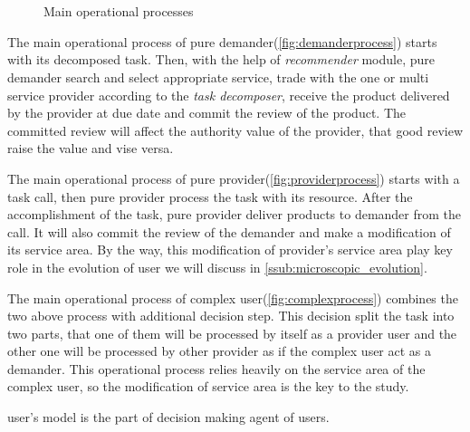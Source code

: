 \begin{figure}[htbp]
\centering
{}\\
\\
\caption{Main operational processes}
\label{fig:useroperation}
\end{figure}

The main operational process of pure demander(\autoref{fig:demanderprocess}) starts with its decomposed task. Then, with the help of \textit{recommender} module, pure demander search and select appropriate service, trade with the one or multi service provider according to the \textit{task decomposer}, receive the product delivered by the provider at due date and commit the review of the product. The committed review will affect the authority value of the provider, that good review raise the value and vise versa.

The main operational process of pure provider(\autoref{fig:providerprocess}) starts with a task call, then pure provider process the task with its resource. After the accomplishment of the task, pure provider deliver products to demander from the call. It will also commit the review of the demander and make a modification of its service area. By the way, this modification of provider's service area play key role in the evolution of user we will discuss in \autoref{ssub:microscopic_evolution}.  

The main operational process of complex user(\autoref{fig:complexprocess}) combines the two above process with additional decision step. This decision split the task into two parts, that one of them will be processed by itself as a provider user and the other one will be processed by other provider as if the complex user act as a demander. This operational process relies heavily on the service area of the complex user, so the modification of service area is the key to the study.

user's model is the part of decision making agent of users.

